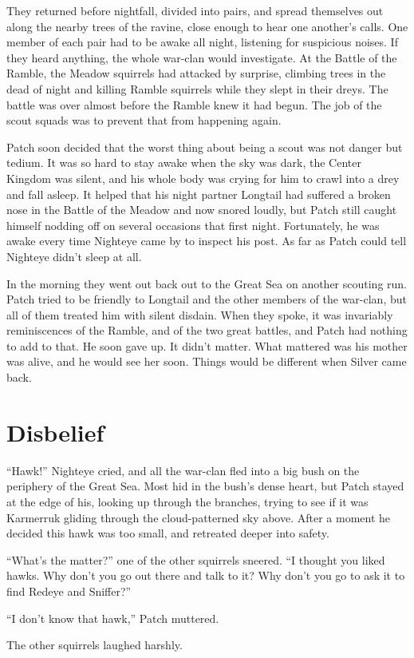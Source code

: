 \documentclass[ebook,oneside,openany,17pt]{memoir}
\renewcommand{\thechapter}{\Roman{chapter}}
\newcounter{sections}
\newcommand{\sections}[1]{%
  \section*{#1}
  \addtocounter{sections}{1}%
  \pdfbookmark[1]{#1}{section.\thechapter.\thesections}}
\begin{document}
They returned before nightfall, divided into pairs, and spread
themselves out along the nearby trees of the ravine, close enough to
hear one another’s calls. One member of each pair had to be awake all
night, listening for suspicious noises. If they heard anything, the
whole war-clan would investigate. At the Battle of the Ramble, the
Meadow squirrels had attacked by surprise, climbing trees in the dead
of night and killing Ramble squirrels while they slept in their
dreys. The battle was over almost before the Ramble knew it had
begun. The job of the scout squads was to prevent that from happening
again.

Patch soon decided that the worst thing about being a scout was not
danger but tedium. It was so hard to stay awake when the sky was dark,
the Center Kingdom was silent, and his whole body was crying for him
to crawl into a drey and fall asleep. It helped that his night partner
Longtail had suffered a broken nose in the Battle of the Meadow and
now snored loudly, but Patch still caught himself nodding off on
several occasions that first night. Fortunately, he was awake every
time Nighteye came by to inspect his post. As far as Patch could tell
Nighteye didn’t sleep at all.

In the morning they went out back out to the Great Sea on another
scouting run. Patch tried to be friendly to Longtail and the other
members of the war-clan, but all of them treated him with silent
disdain. When they spoke, it was invariably reminiscences of the
Ramble, and of the two great battles, and Patch had nothing to add to
that. He soon gave up. It didn’t matter. What mattered was his mother
was alive, and he would see her soon. Things would be different when
Silver came back.


\sections{Disbelief}

“Hawk!” Nighteye cried, and all the war-clan fled into a big bush on
the periphery of the Great Sea. Most hid in the bush’s dense heart,
but Patch stayed at the edge of his, looking up through the branches,
trying to see if it was Karmerruk gliding through the cloud-patterned
sky above. After a moment he decided this hawk was too small, and
retreated deeper into safety.

“What’s the matter?” one of the other squirrels sneered. “I thought
you liked hawks. Why don’t you go out there and talk to it? Why don’t
you go to ask it to find Redeye and Sniffer?”

“I don’t know that hawk,” Patch muttered.

The other squirrels laughed harshly.
\end{document}
